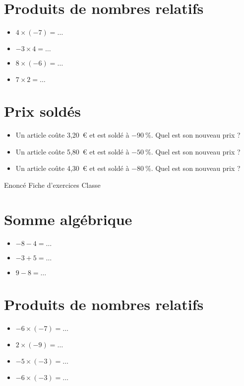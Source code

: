 \documentclass[a4paper,11pt,fleqn]{article}		%
\begin{document}
\section{Produits de nombres relatifs}
\begin{itemize}

  \item $4\times(-7)=\ldots$
  \item $-3\times4=\ldots$
  \item $8\times(-6)=\ldots$
  \item $7\times2=\ldots$
\end{itemize}


\section{Prix soldés}
\begin{itemize}

  \item Un article coûte 3,20~€ et est soldé à $-90~\%$. Quel est son nouveau prix ?
  \item Un article coûte 5,80~€ et est soldé à $-50~\%$. Quel est son nouveau prix ?
  \item Un article coûte 4,30~€ et est soldé à $-80~\%$. Quel est son nouveau prix ?
\end{itemize}
\newpage
\setcounter{exo}{0}
\setcounter{section}{0}
{Enoncé} \hfill {\huge Fiche d'exercices } \hfill {Classe}

\section{Somme algébrique}
\begin{itemize}

  \item $-8 -4=\ldots$
  \item $-3 +5=\ldots$
  \item $9 -8=\ldots$
\end{itemize}


\section{Produits de nombres relatifs}
\begin{itemize}

  \item $-6\times(-7)=\ldots$
  \item $2\times(-9)=\ldots$
  \item $-5\times(-3)=\ldots$
  \item $-6\times(-3)=\ldots$
\end{itemize}
\end{document}
